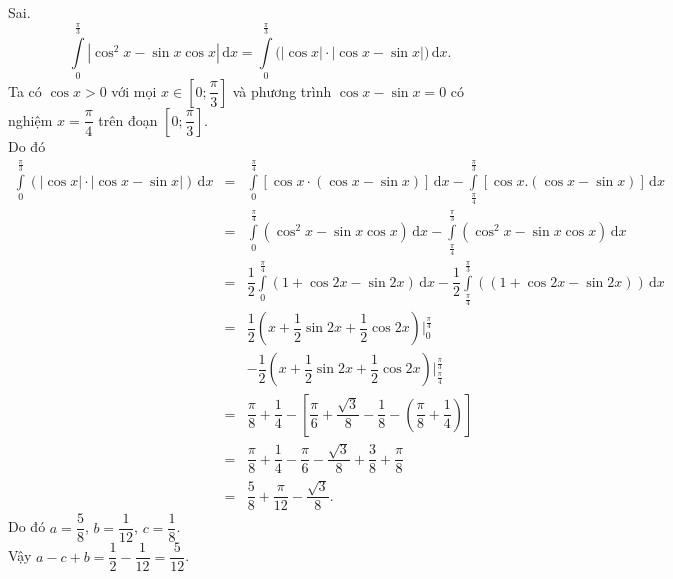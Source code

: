 \begin{ex}
{\begin{itemchoice}
\itemch Sai. $$
\displaystyle\int\limits_0^{\tfrac{\pi}{3}}\left|\cos^2 x-\sin x \cos x\right|\mathrm{\,d}x=\displaystyle\int\limits_0^{\tfrac{\pi}{3}}\big(|\cos x|\cdot|\cos x-\sin x|\big)\mathrm{\,d}x.
$$
Ta có $\cos x > 0$ với mọi $x \in\left[0; \dfrac{\pi}{3}\right]$ và phương trình $\cos x-\sin x=0$ có nghiệm $x=\dfrac{\pi}{4}$ trên đoạn $\left[0; \dfrac{\pi}{3}\right]$.\\
Do đó
\allowdisplaybreaks
\begin{eqnarray*}
\displaystyle\int\limits_0^{\tfrac{\pi}{3}}(|\cos x|\cdot|\cos x-\sin x|)\mathrm{\,d} x&=&\displaystyle\int\limits_0^{\tfrac{\pi}{4}}[\cos x \cdot(\cos x-\sin x)]\mathrm{\,d} x-\displaystyle\int\limits_{\tfrac{\pi}{4}}^{\tfrac{\pi}{3}}[\cos x.(\cos x-\sin x)]\mathrm{\,d}x\\
&=&\displaystyle\int\limits_0^{\tfrac{\pi}{4}}\left(\cos ^2x-\sin x \cos x\right)\mathrm{\,d} x-\displaystyle\int\limits_{\tfrac{\pi}{4}}^{\tfrac{\pi}{3}}\left(\cos ^2x-\sin x \cos x\right)\mathrm{\,d}x\\
&=&\dfrac{1}{2} \displaystyle\int\limits_0^{\tfrac{\pi}{4}}(1+\cos 2x-\sin 2x)\mathrm{\,d}x-\dfrac{1}{2} \displaystyle\int\limits_{\tfrac{\pi}{4}}^{\tfrac{\pi}{3}}((1+\cos 2x-\sin 2x))\mathrm{\,d}x\\
&=&\dfrac{1}{2}\left(x+\dfrac{1}{2} \sin 2x+\dfrac{1}{2} \cos 2x\right)\bigg|_0 ^{\tfrac{\pi}{4}}\\&&-\dfrac{1}{2}\left(x+\dfrac{1}{2} \sin 2x+\dfrac{1}{2} \cos 2x\right)\bigg|_{\tfrac{\pi}{4}} ^{\tfrac{\pi}{3}}\\
&=&\dfrac{\pi}{8}+\dfrac{1}{4}-\left[\dfrac{\pi}{6}+\dfrac{\sqrt{3}}{8}-\dfrac{1}{8}-\left(\dfrac{\pi}{8}+\dfrac{1}{4}\right)\right]\\&=&\dfrac{\pi}{8}+\dfrac{1}{4}-\dfrac{\pi}{6}-\dfrac{\sqrt{3}}{8}+\dfrac{3}{8}+\dfrac{\pi}{8}\\&=&\dfrac{5}{8}+\dfrac{\pi}{12}-\dfrac{\sqrt{3}}{8}.
\end{eqnarray*}
Do đó $a=\dfrac{5}{8}$, $b=\dfrac{1}{12}$, $c=\dfrac{1}{8}$.\\ Vậy $a-c+b=\dfrac{1}{2}-\dfrac{1}{12}=\dfrac{5}{12}$.
\end{itemchoice}
}
\end{ex}

